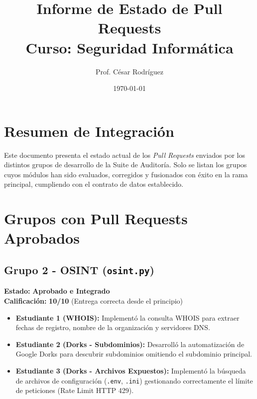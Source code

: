 \documentclass[12pt,a4paper]{article}
\title{Informe de Estado de Pull Requests \\ \large Curso: Seguridad Informática}
\author{Prof. César Rodríguez}
\date{\today}
\begin{document}
\maketitle

\section*{Resumen de Integración}
Este documento presenta el estado actual de los \textit{Pull Requests} enviados por los distintos grupos de desarrollo de la Suite de Auditoría. Solo se listan los grupos cuyos módulos han sido evaluados, corregidos y fusionados con éxito en la rama principal, cumpliendo con el contrato de datos establecido.

\section*{Grupos con Pull Requests Aprobados}

\subsection*{Grupo 2 - OSINT (\texttt{osint.py})}
\textbf{Estado:} \textcolor{green!70!black}{\textbf{Aprobado e Integrado}} \\
\textbf{Calificación:} \textbf{10/10} (Entrega correcta desde el principio)
\begin{itemize}[label=$\bullet$]
    \item \textbf{Estudiante 1 (WHOIS):} Implementó la consulta WHOIS para extraer fechas de registro, nombre de la organización y servidores DNS.
    \item \textbf{Estudiante 2 (Dorks - Subdominios):} Desarrolló la automatización de Google Dorks para descubrir subdominios omitiendo el subdominio principal.
    \item \textbf{Estudiante 3 (Dorks - Archivos Expuestos):} Implementó la búsqueda de archivos de configuración (\texttt{.env}, \texttt{.ini}) gestionando correctamente el límite de peticiones (Rate Limit HTTP 429).
\end{itemize}
\end{document}
